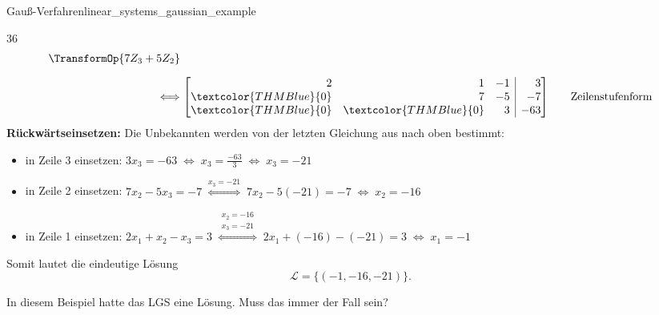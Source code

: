\begin{minipage}{\linewidth}
\begin{ExampleBox}{Gauß-Verfahren}{linear_systems_gaussian_example}
\begin{ClozeArea}[34]{36}
\[\begin{array}{r@{\;}r@{\qquad}l}
\begin{array}{@{}l@{}}
          \smash{\TransformOp{7Z_3+5Z_2}}
        \end{array}\\[1.0em]
        \Longleftrightarrow
        &\left[\begin{array}{@{}rrr|r@{}}
          2&1&-1&3\\
          \textcolor{THMBlue}{0}&7&-5&-7\\
          \textcolor{THMBlue}{0}&\textcolor{THMBlue}{0}&3&-63
        \end{array}\right]
        &\text{Zeilenstufenform}
      \end{array}
    \]
    \textbf{Rückwärtseinsetzen:} Die Unbekannten werden von der letzten
    Gleichung aus nach oben bestimmt:
    \begin{itemize}[leftmargin=1.4em,itemsep=0.55em,topsep=0.3em]
      \item in Zeile 3 einsetzen:\qquad
        \(
          3x_3=-63
          \;\Longleftrightarrow\;
          x_3=\frac{-63}{3}
          \;\Longleftrightarrow\;
          x_3=-21
        \)
      \item in Zeile 2 einsetzen: \qquad
        \(
          7x_2-5x_3=-7
          \;\overset{x_3=-21}{\Longleftrightarrow}\;
          7x_2-5(-21)=-7
          \;\Longleftrightarrow\;
          x_2=-16
        \)
      \item in Zeile 1 einsetzen: \qquad
        \(
          2x_1+x_2-x_3=3
          \;\overset{\substack{x_2=-16\\x_3=-21}}{\Longleftrightarrow}\;
          2x_1+(-16)-(-21)=3
          \;\Longleftrightarrow\;
          x_1=-1
        \)
    \end{itemize}
    Somit lautet die eindeutige Lösung
    \[
      \mathcal{L}=\{(-1,-16,-21)\}.
    \]
  \end{ClozeArea}
\end{ExampleBox}

In diesem Beispiel hatte das LGS eine Lösung. Muss das immer der Fall sein?
\end{minipage}
